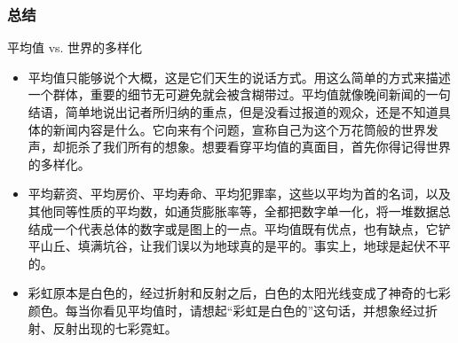 \begin{frame}
  \frametitle{总结}
  \begin{block}{平均值 vs. 世界的多样化}
    \begin{itemize}
      \item 平均值只能够说个大概，这是它们天生的说话方式。用这么简单的方式来描述一个群体，重要的细节无可避免就会被含糊带过。平均值就像晚间新闻的一句结语，简单地说出记者所归纳的重点，但是没看过报道的观众，还是不知道具体的新闻内容是什么。它向来有个问题，宣称自己为这个万花筒般的世界发声，却扼杀了我们所有的想象。想要看穿平均值的真面目，首先你得记得世界的多样化。
      \item 平均薪资、平均房价、平均寿命、平均犯罪率，这些以平均为首的名词，以及其他同等性质的平均数，如通货膨胀率等，全都把数字单一化，将一堆数据总结成一个代表总体的数字或是图上的一点。平均值既有优点，也有缺点，它铲平山丘、填满坑谷，让我们误以为地球真的是平的。事实上，地球是起伏不平的。
      \item 彩虹原本是白色的，经过折射和反射之后，白色的太阳光线变成了神奇的七彩颜色。每当你看见平均值时，请想起“彩虹是白色的”这句话，并想象经过折射、反射出现的七彩霓虹。
    \end{itemize}
  \end{block}
\end{frame}




